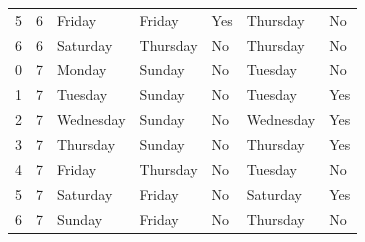 \documentclass{article} %
\theoremstyle{plain}
\theoremstyle{definition}
\begin{document}
\begin{table}
\begin{tabular}{rrlllll}
5 & 6 & Friday & Friday & Yes & Thursday & No \\
6 & 6 & Saturday & Thursday & No & Thursday & No \\
0 & 7 & Monday & Sunday & No & Tuesday & No \\
1 & 7 & Tuesday & Sunday & No & Tuesday & Yes \\
2 & 7 & Wednesday & Sunday & No & Wednesday & Yes \\
3 & 7 & Thursday & Sunday & No & Thursday & Yes \\
4 & 7 & Friday & Thursday & No & Tuesday & No \\
5 & 7 & Saturday & Friday & No & Saturday & Yes \\
6 & 7 & Sunday & Friday & No & Thursday & No \\
\bottomrule
\end{tabular}
\end{table}
\end{document}
